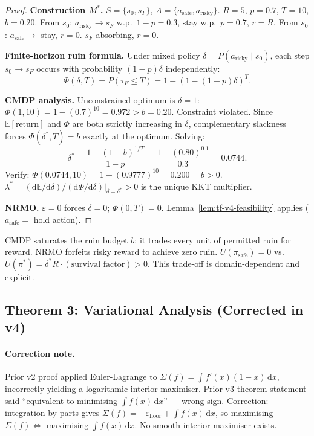 \begin{proof}
\medskip\noindent\textbf{Construction $M^*$.}
$S = \{s_0, s_F\}$, $A = \{a_{\mathrm{safe}}, a_{\mathrm{risky}}\}$.
$R = 5$, $p = 0.7$, $T = 10$, $b = 0.20$. From $s_0$:
$a_{\mathrm{risky}} \to s_F$ w.p.~$1 - p = 0.3$, stay w.p.~$p = 0.7$,
$r = R$. From $s_0$: $a_{\mathrm{safe}} \to$ stay, $r = 0$. $s_F$
absorbing, $r = 0$.

\medskip\noindent\textbf{Finite-horizon ruin formula.}
Under mixed policy $\delta = P(a_{\mathrm{risky}} \mid s_0)$, each
step $s_0 \to s_F$ occurs with probability $(1 - p) \delta$
independently:
\begin{equation}
\Phi(\delta, T) = P(\tau_F \le T) = 1 - (1 - (1 - p) \delta)^T.
\end{equation}

\medskip\noindent\textbf{CMDP analysis.}
Unconstrained optimum is $\delta = 1$:
$\Phi(1, 10) = 1 - (0.7)^{10} = 0.972 > b = 0.20$. Constraint
violated. Since $\mathbb{E}[\mathrm{return}]$ and $\Phi$ are both
strictly increasing in $\delta$, complementary slackness forces
$\Phi(\delta^*, T) = b$ exactly at the optimum. Solving:
\begin{equation}
\delta^* = \frac{1 - (1 - b)^{1/T}}{1 - p}
= \frac{1 - (0.80)^{0.1}}{0.3} = 0.0744.
\end{equation}
Verify: $\Phi(0.0744, 10) = 1 - (0.9777)^{10} = 0.200 = b > 0$.
$\lambda^* = (\mathrm{d}\mathbb{E} / \mathrm{d}\delta) /
(\mathrm{d}\Phi / \mathrm{d}\delta) \rvert_{\delta = \delta^*} > 0$
is the unique KKT multiplier.

\medskip\noindent\textbf{NRMO.}
$\varepsilon = 0$ forces $\delta = 0$; $\Phi(0, T) = 0$.
Lemma~\ref{lem:tf-v4-feasibility} applies
($a_{\mathrm{safe}} = $ hold action).
\end{proof}

\begin{remark}
CMDP saturates the ruin budget $b$: it trades every unit of permitted
ruin for reward. NRMO forfeits risky reward to achieve zero ruin.
$U(\pi_{\mathrm{safe}}) = 0$ vs.~$U(\pi^*) = \delta^* R \cdot
(\text{survival factor}) > 0$. This trade-off is domain-dependent
and explicit.
\end{remark}

\subsection{Theorem 3: Variational Analysis (Corrected in v4)}

\paragraph{Correction note.}
Prior v2 proof applied Euler-Lagrange to
$\Sigma(f) = \int f'(x)(1 - x)\,\mathrm{d}x$, incorrectly yielding a
logarithmic interior maximiser. Prior v3 theorem statement said
``equivalent to minimising $\int f(x)\,\mathrm{d}x$'' --- wrong sign.
Correction: integration by parts gives $\Sigma(f) = -\varepsilon_{\mathrm{floor}}
+ \int f(x)\,\mathrm{d}x$, so maximising $\Sigma(f) \Leftrightarrow$
maximising $\int f(x)\,\mathrm{d}x$. No smooth interior maximiser
exists.

